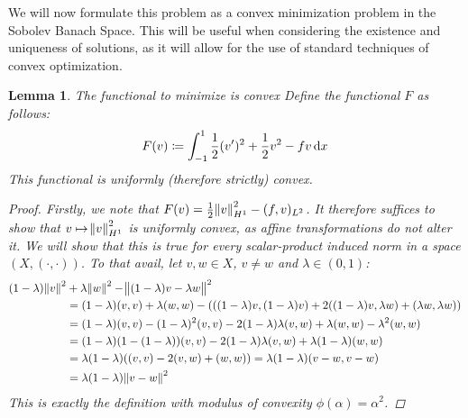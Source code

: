 \documentclass[headsepline,footsepline,footinclude=false,oneside,fontsize=11pt,paper=a4,listof=totoc,bibliography=totoc]{scrbook} %
\newtheorem{lemma}{Lemma}
\begin{document}
We will now formulate this problem as a convex minimization problem in the Sobolev Banach Space. This will be useful when considering the existence and uniqueness of solutions, as it will allow for the use of standard techniques of convex optimization.

\begin{lemma} The functional to minimize is convex \newline
	Define the functional $F$ as follows:
	\begin{equation}
			F(v) \coloneqq \int_{-1}^1{\frac{1}{2} (v')^2 + \frac{1}{2} v^2 - fv \dif x}
	\end{equation}
	This functional is uniformly (therefore strictly) convex.
	\begin{proof}
		Firstly, we note that $F(v) = \frac{1}{2} \norm{v}_{H^1}^2 - (f,v)_{L^2} $. It therefore suffices to show that $v \mapsto \norm{v}_{H^1}^2$ is uniformly convex, as affine transformations do not alter it. We will show that this is true for every scalar-product induced norm in a space $(X, (\cdot,\cdot))$. To that avail, let $v,w \in X$, $v \neq w$ and $\lambda \in (0,1)$:
		\begin{align*}
		(1-\lambda)\norm{v}^2 &+ \lambda\norm{w}^2 - \norm{(1-\lambda)v - \lambda w}^2 \\
		& = (1-\lambda) (v,v) + \lambda (w,w) - (((1-\lambda)v,(1-\lambda)v) + 2((1-\lambda)v, \lambda w)+ (\lambda w, \lambda w)) \\
		&= (1-\lambda) (v,v) - (1-\lambda)^2 (v,v) - 2 (1-\lambda)\lambda(v,w) + \lambda (w,w) - \lambda^2 (w,w) \\
		&= (1-\lambda)(1-(1-\lambda))(v,v)- 2 (1-\lambda)\lambda(v,w) + \lambda (1-\lambda)(w,w) \\
		&= \lambda(1- \lambda)((v,v) - 2(v,w)+(w,w)) = \lambda(1-\lambda)(v-w,v-w) \\
		&= \lambda(1-\lambda)\norm{v-w}^2
		\end{align*}
		This is exactly the definition with modulus of convexity $\phi(\alpha) = \alpha ^2$.
		
	\end{proof}
\end{lemma}
\end{document}
